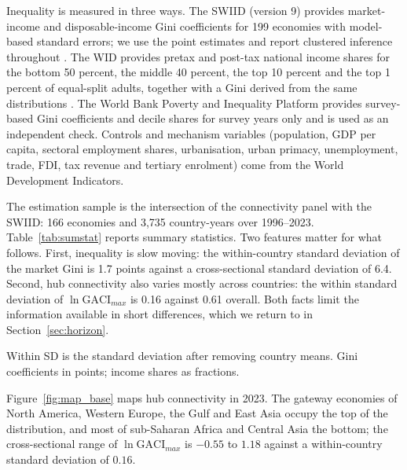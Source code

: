 \documentclass[12pt]{article}
\begin{document}
Inequality is measured in three ways. The SWIID (version 9) provides market-income and disposable-income Gini coefficients for 199 economies with model-based standard errors; we use the point estimates and report clustered inference throughout \citep{Solt_2020}. The WID provides pretax and post-tax national income shares for the bottom 50 percent, the middle 40 percent, the top 10 percent and the top 1 percent of equal-split adults, together with a Gini derived from the same distributions \citep{WID_2024}. The World Bank Poverty and Inequality Platform provides survey-based Gini coefficients and decile shares for survey years only and is used as an independent check. Controls and mechanism variables (population, GDP per capita, sectoral employment shares, urbanisation, urban primacy, unemployment, trade, FDI, tax revenue and tertiary enrolment) come from the World Development Indicators.

The estimation sample is the intersection of the connectivity panel with the SWIID: 166 economies and 3,735 country-years over 1996--2023. Table~\ref{tab:sumstat} reports summary statistics. Two features matter for what follows. First, inequality is slow moving: the within-country standard deviation of the market Gini is 1.7 points against a cross-sectional standard deviation of 6.4. Second, hub connectivity also varies mostly across countries: the within standard deviation of $\ln\mathrm{GACI}_{max}$ is 0.16 against 0.61 overall. Both facts limit the information available in short differences, which we return to in Section~\ref{sec:horizon}.

\begin{table}[H]\centering\caption{Summary statistics, estimation sample (166 economies, 1996--2023).}\label{tab:sumstat}
\begin{threeparttable}\small
\begin{tablenotes}\footnotesize\item Within SD is the standard deviation after removing country means. Gini coefficients in points; income shares as fractions.\end{tablenotes}\end{threeparttable}\end{table}

Figure~\ref{fig:map_base} maps hub connectivity in 2023. The gateway economies of North America, Western Europe, the Gulf and East Asia occupy the top of the distribution, and most of sub-Saharan Africa and Central Asia the bottom; the cross-sectional range of $\ln\mathrm{GACI}_{max}$ is $-0.55$ to $1.18$ against a within-country standard deviation of $0.16$.
\end{document}
